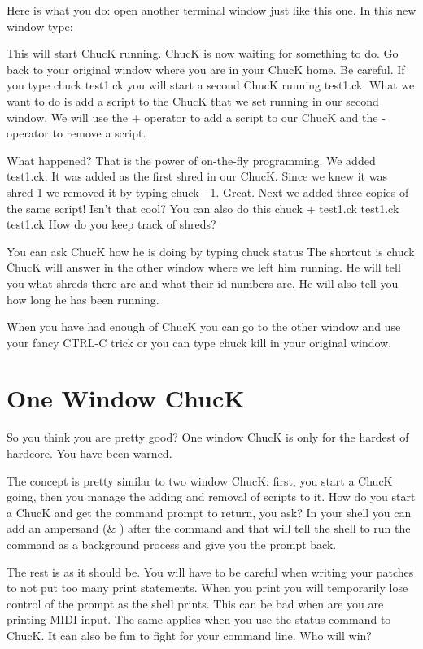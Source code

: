 Here is what you do: open another terminal window just like this one. In this new window type:

This will start ChucK running. ChucK is now waiting for something to do. Go back to your original window where you are in your ChucK home. Be careful. If you type chuck test1.ck you will start a second ChucK running test1.ck. What we want to do is add a script to the ChucK that we set running in our second window. We will use the + operator to add a script to our ChucK and the - operator to remove a script. 


What happened? That is the power of on-the-fly programming. We added test1.ck. It was added as the first shred in our ChucK. Since we knew it was shred 1 we removed it by typing chuck - 1. Great. Next we added three copies of the same script! Isn't that cool? You can also do this chuck + test1.ck test1.ck test1.ck How do you keep track of shreds? 

You can ask ChucK how he is doing by typing chuck \doubledash status The shortcut is chuck \^ ChucK will answer in the other window where we left him running. He will tell you what shreds there are and what their id numbers are. He will also tell you how long he has been running. 

When you have had enough of ChucK you can go to the other window and use your fancy CTRL-C trick or you can type chuck \doubledash kill in your original window.   


\section*{One Window ChucK}

So you think you are pretty good? One window ChucK is only for the hardest of hardcore. You have been warned. 

The concept is pretty similar to two window ChucK: first, you start a ChucK going, then you manage the adding and removal of scripts to it. How do you start a ChucK and get the command prompt to return, you ask? In your shell you can add an ampersand (\& ) after the command and that will tell the shell to run the command as a background process and give you the prompt back. 


The rest is as it should be. You will have to be careful when writing your patches to not put too many print statements. When you print you will temporarily lose control of the prompt as the shell prints. This can be bad when are you are printing MIDI input. The same applies when you use the \doubledash status command to ChucK. It can also be fun to fight for your command line. Who will win?
